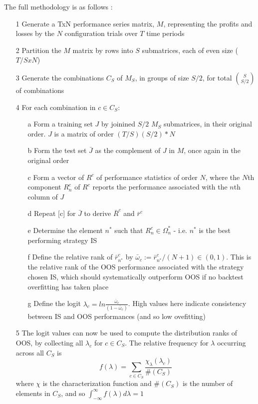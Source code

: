 \documentclass[a4paper,latin]{paper}
\begin{document}
The full methodology is as follows \cite{BailyPBO}:
\begin{itemize}
	\item[1]Generate a TxN performance series matrix, $M$, representing the profits and losses by the $N$ configuration trials over $T$ time periods
	\item[2]Partition the $M$ matrix by rows into $S$ submatrices, each of even size ($T/S x N$)
	\item[3]Generate the combinations $C_S$ of $M_S$, in groups of size $S/2$, for total $\binom{S}{S/2}$ of combinations
	\item[4]For each combination in $c \in C_S$:
	\begin{itemize}
		\item [a] Form a training set $J$ by joinined $S/2$ $M_S$ submatrices, in their original order. $J$ is a matrix of order $(T/S)(S/2)*N $
		\item [b] Form the test set $\bar{J}$ as the complement of $J$ in $M$, once again in the original order
		\item [c] Form a vector of $R^c$ of performance statistics of order $N$, where the $N$th component $R_n^c$ of $R^c$ reports the performance associated with the $n$th column of $J$
		\item [d] Repeat [c] for $\bar{J}$ to derive $\bar{R}^c$ and $\bar{r}^c$
		\item [e] Determine the element $n^*$ such that $R^c_n \in \Omega^*_n$ - i.e. $n^*$ is the best performing strategy IS
		\item [f] Define the relative rank of $\bar{r}^c_{n^*}$ by $\bar{\omega}_c := \bar{r}^c_{n^*} / (N +1) \in (0,1)$. This is the relative rank of the OOS performance associated with the strategy chosen IS, which should systematically outperform OOS if no backtest overfitting has taken place
		\item[g] Define the logit $\lambda_c = ln \frac{\bar{\omega}_c}{(1-\bar{\omega}_c)}$. High values here indicate consistency between IS and OOS performances (and so low ovefitting)
	\end{itemize}
	\item [5] The logit values can now be used to compute the distribution ranks of OOS, by collecting all $\lambda_c$ for $c \in C_S$. The relative frequency for $\lambda$ occurring across all $C_S$ is 
	\begin{equation}
	f(\lambda) = \sum_{c \in C_S}\frac{\chi_{\lambda}(\lambda_c)}{\#(C_S)}
	\end{equation}
	where $\chi$ is the characterization function and $\#(C_S)$ is the number of elements in $C_S$, and so $\int_{-\infty}^{\infty} f (\lambda) d \lambda = 1$
\end{itemize}
\end{document}
